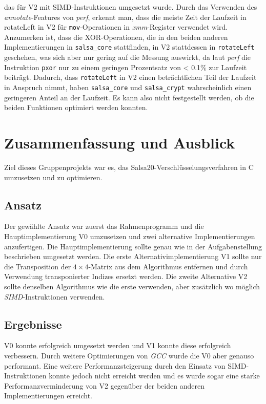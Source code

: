 \documentclass[course=erap]{aspdoc}
\begin{document}
das für V2 mit SIMD-Instruktionen umgesetzt wurde. Durch das Verwenden des \emph{annotate}-Features von 
\emph{perf}, erkennt man, dass die meiste Zeit der Laufzeit in rotateLeft in V2 für \texttt{mov}-Operationen in 
\emph{xmm}-Register verwendet wird. Anzumerken ist, dass die XOR-Operationen, die in den beiden anderen Implementierungen
in \texttt{salsa\_core} stattfinden, in V2 stattdessen in \texttt{rotateLeft} geschehen, was sich aber nur gering 
auf die Messung auswirkt, da laut \emph{perf} die Instruktion \texttt{pxor} nur zu einem geringen 
Prozentsatz von < 0.1\% zur Laufzeit beiträgt.
Dadurch, dass \texttt{rotateLeft} in V2 einen beträchtlichen Teil der Laufzeit in Anspruch nimmt,
haben \texttt{salsa\_core} und \texttt{salsa\_crypt} wahrscheinlich einen geringeren Anteil an der Laufzeit. Es kann 
also nicht festgestellt werden, ob die beiden Funktionen optimiert werden konnten.


\section{Zusammenfassung und Ausblick}
Ziel dieses Gruppenprojekts war es, das Salsa20-Verschlüsselungsverfahren in C umzusetzen und zu optimieren.

\subsection{Ansatz}
Der gewählte Ansatz war zuerst das Rahmenprogramm und die Hauptimplementierung V0 umzusetzen 
und zwei alternative Implementierungen anzufertigen. Die Hauptimplementierung sollte genau wie 
in der Aufgabenstellung beschrieben umgesetzt werden.
Die erste Alternativimplementierung V1 sollte nur die Transposition der $4\times 4$-Matrix aus 
dem Algorithmus entfernen und durch Verwendung transponierter Indizes ersetzt werden. Die zweite Alternative V2
sollte denselben Algorithmus wie die erste verwenden, aber zusätzlich wo möglich \emph{SIMD}-Instruktionen verwenden.

\subsection{Ergebnisse}
V0 konnte erfolgreich umgesetzt werden und V1 konnte 
diese erfolgreich verbessern. Durch weitere Optimierungen von \emph{GCC} wurde die V0 aber
genauso performant.
Eine weitere Performanzsteigerung durch den Einsatz von SIMD-Instruktionen konnte jedoch nicht erreicht werden
und es wurde sogar eine starke Performanzverminderung von V2 gegenüber der beiden anderen Implementierungen erreicht.
\end{document}
